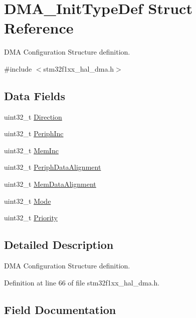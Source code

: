 \hypertarget{struct_d_m_a___init_type_def}{}\section{D\+M\+A\+\_\+\+Init\+Type\+Def Struct Reference}
\label{struct_d_m_a___init_type_def}


D\+MA Configuration Structure definition.  




{\ttfamily \#include $<$stm32f1xx\+\_\+hal\+\_\+dma.\+h$>$}

\subsection*{Data Fields}
\begin{DoxyCompactItemize}
\item 
uint32\+\_\+t \hyperlink{struct_d_m_a___init_type_def_ab94410c1333b512e271b1c135fe50916}{Direction}
\item 
uint32\+\_\+t \hyperlink{struct_d_m_a___init_type_def_a4925ca3ceb52340daddc92817dc304d9}{Periph\+Inc}
\item 
uint32\+\_\+t \hyperlink{struct_d_m_a___init_type_def_a831756fbcd64feb1e570a9bf743b5b8d}{Mem\+Inc}
\item 
uint32\+\_\+t \hyperlink{struct_d_m_a___init_type_def_aca5b89241171c093fd0fc6dacf72683c}{Periph\+Data\+Alignment}
\item 
uint32\+\_\+t \hyperlink{struct_d_m_a___init_type_def_afe3adac32f5411b1a744c030f398aa5e}{Mem\+Data\+Alignment}
\item 
uint32\+\_\+t \hyperlink{struct_d_m_a___init_type_def_a0ffc93ec511ed9cf1663f6939bd3e839}{Mode}
\item 
uint32\+\_\+t \hyperlink{struct_d_m_a___init_type_def_a72acf77c0b19359eb70764505ae4bd70}{Priority}
\end{DoxyCompactItemize}


\subsection{Detailed Description}
D\+MA Configuration Structure definition. 

Definition at line 66 of file stm32f1xx\+\_\+hal\+\_\+dma.\+h.



\subsection{Field Documentation}
\mbox{\label{struct_d_m_a___init_type_def_ab94410c1333b512e271b1c135fe50916}} 
